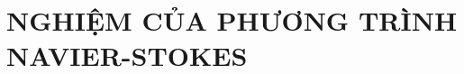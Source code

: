 \documentclass[CO_LUU_CHAT.tex]{subfiles}
\begin{document}
\chapter{NGHIỆM CỦA PHƯƠNG TRÌNH NAVIER-STOKES}
\newpage
\end{document}

